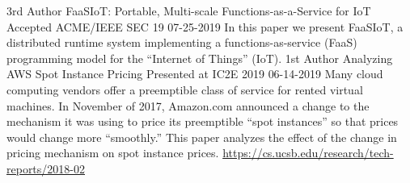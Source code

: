 \begin{cventries}
  \cventry
    {3rd Author}
    {FaaSIoT: Portable, Multi-scale Functions-as-a-Service for IoT}
    {Accepted ACME/IEEE SEC 19}
    {07-25-2019}
    {
      In this paper we present FaaSIoT, a distributed runtime system implementing a functions-as-service (FaaS) programming model for the “Internet of Things” (IoT).
    }
  \cventry
    {1st Author}
    {Analyzing AWS Spot Instance Pricing}
    {Presented at IC2E 2019}
    {06-14-2019}
    {
      Many cloud computing vendors offer a preemptible class of service for rented virtual machines.  In November of 2017, Amazon.com announced a change to the mechanism it was using to price its preemptible ``spot instances'' so that prices would change more ``smoothly.''  This paper analyzes the effect of the change in pricing mechanism on spot instance prices. 
      \url{https://cs.ucsb.edu/research/tech-reports/2018-02}
    }
\end{cventries}
